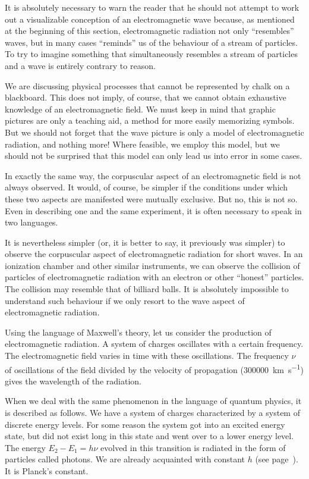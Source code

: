 It is absolutely necessary to warn the reader that he should not attempt to work out a visualizable conception of an electromagnetic wave because, as mentioned at the beginning of this section, electromagnetic radiation not only ``resembles'' waves, but in many cases ``reminds'' us of the behaviour of a stream of particles. To try to imagine something that simultaneously resembles a stream of particles and a wave is entirely contrary to reason. 

We are discussing physical processes that cannot be represented by chalk on a blackboard. This does not imply, of course, that we cannot obtain exhaustive knowledge of an electromagnetic field. We must keep in mind that graphic pictures are only a teaching aid, a method for more easily memorizing symbols. But we should not forget that the wave picture is only a model of electromagnetic radiation, and nothing more! Where feasible, we employ this model, but we should not be surprised that this model can only lead us into error in some cases.

In exactly the same way, the corpuscular aspect of an electromagnetic field is not always observed. It would, of course, be simpler if the conditions under which these two aspects are manifested were mutually exclusive. But no, this is not so. Even in describing one and the same experiment, it is often necessary to speak in two languages.

It is nevertheless simpler (or, it is better to say, it previously was simpler) to observe the corpuscular aspect of electromagnetic radiation for short waves. In an ionization chamber and other similar instruments, we can observe the collision of particles of electromagnetic radiation with an electron or other ``honest'' particles. The collision may resemble that of billiard balls. It is absolutely impossible to understand such behaviour if we only resort to the wave aspect of electromagnetic radiation.

Using the language of Maxwell's theory, let us consider the production of electromagnetic radiation. A system of charges oscillates with a certain frequency. The electromagnetic field varies in time with these oscillations. The frequency $\nu$ of oscillations of the field divided by the velocity of propagation (\SI{300000}{\kilo\meter\per\second}) gives the wavelength of the radiation.

When we deal with the same phenomenon in the language of quantum physics, it is described as follows. We have a system of charges characterized by a system of discrete energy levels. For some reason the system got into an excited energy state, but did not exist long in this state and went over to a lower energy level. The energy $E_{2}-E_{1}=h\nu$ evolved in this transition is radiated in the form of particles called photons. We are already acquainted with constant $h$ (see page~\pageref{ang-mom}). It is Planck's constant.



